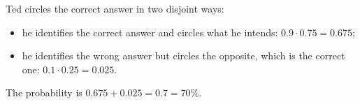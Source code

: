 Ted circles the correct answer in two disjoint ways:
\begin{itemize}
\item he identifies the correct answer and circles what he intends: $0.9\cdot0.75=0.675$;
\item he identifies the wrong answer but circles the opposite, which is the correct one: $0.1\cdot0.25=0.025$.
\end{itemize}
The probability is $0.675+0.025=0.7=\boxed{70\%}$.
